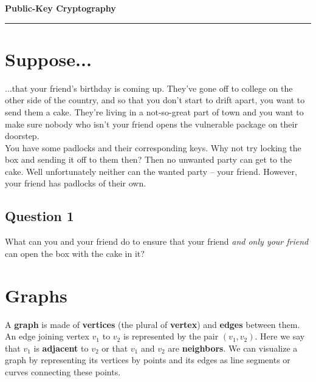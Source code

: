 \documentclass[12pt]{article}
\begin{document}
\begin{center}
{\bf \Large Public-Key Cryptography}
\vspace{0.2cm}
\hrule
\end{center}

\section*{Suppose...}
...that your friend's birthday is coming up. They've gone off to college on the other side of the country, and so that you don't start to drift apart, you want to send them a cake. They're living in a not-so-great part of town and you want to make sure nobody who isn't your friend opens the vulnerable package on their doorstep.\\

\noindent You have some padlocks and their corresponding keys. Why not try locking the box and sending it off to them then? Then no unwanted party can get to the cake. Well unfortunately neither can the wanted party -- your friend. However, your friend has padlocks of their own.

\subsection*{Question 1}
What can you and your friend do to ensure that your friend \textit{and only your friend} can open the box with the cake in it?

\vspace{3cm}

\section*{Graphs}
A \textbf{graph} is made of \textbf{vertices} (the plural of \textbf{vertex}) and \textbf{edges} between them. An edge joining vertex $v_1$ to $v_2$ is represented by the pair $(v_1, v_2)$. Here we say that $v_1$ is \textbf{adjacent} to $v_2$ or that $v_1$ and $v_2$ are \textbf{neighbors}. We can visualize a graph by representing its vertices by points and its edges as line segments or curves connecting these points.\\
\end{document}
